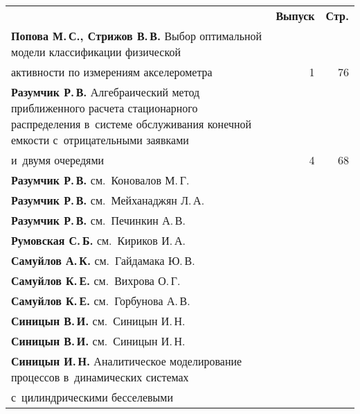 \pagebreak

\def\leftkol{АВТОРСКИЙ УКАЗАТЕЛЬ ЗА 2015 г.} %

\def\rightkol{АВТОРСКИЙ УКАЗАТЕЛЬ ЗА 2015 г.} %

\def\leftfootline{\small{\textbf{\thepage}
\hfill ИНФОРМАТИКА И ЕЁ ПРИМЕНЕНИЯ\ \ \ том~9\ \ \ выпуск~4\ \ \ 2015}
}%
 \def\rightfootline{\small{ИНФОРМАТИКА И ЕЁ ПРИМЕНЕНИЯ\ \ \ том~9\ \ \ выпуск~4\ \ \ 2015
 \hfill \textbf{\thepage}}}


{\tabcolsep=3pt
\begin{tabular}{p{388pt}rr}
&\textbf{Выпуск} & \textbf{Стр.}\\[3pt]
\textbf{Попова М.\,С., Стрижов В.\,В.} Выбор оптимальной модели
классификации физической\linebreak
\\[-12pt]
\hspace*{21pt}активности по измерениям
акселерометра&1&76\\[-.35pt]
\hangindent=21pt\noindent\textbf{Разумчик Р.\,В.} Алгебраический метод приближенного расчета
стационарного распределения в~сис\-те\-ме обслуживания конечной емкости
с~отрицательными заявками\linebreak
\\[-12pt]
\hspace*{21pt}и~двумя очередями&4&68\\[-.35pt]
\textbf{Разумчик Р.\,В.} см.\ Коновалов М.\,Г.&&\\[-.35pt]
\textbf{Разумчик Р.\,В.} см.\ Мейханаджян Л.\,А.&&\\[-.35pt]
\textbf{Разумчик Р.\,В.} см.\ Печинкин А.\,В.&&\\[-.35pt]
\textbf{Румовская С.\,Б.} см.\ Кириков И.\,А.&&\\[-.35pt]
\textbf{Самуйлов А.\,К.} см.\ Гайдамака Ю.\,В.&&\\[-.35pt]
\textbf{Самуйлов К.\,Е.} см.\ Вихрова О.\,Г.&&\\[-.35pt]
\textbf{Самуйлов К.\,Е.} см.\ Горбунова А.\,В.&&\\[-.35pt]
\textbf{Синицын В.\,И.} см.\ Синицын И.\,Н.&&\\[-.35pt]
\textbf{Синицын В.\,И.} см.\ Синицын И.\,Н.&&\\[-.35pt]
\textbf{Синицын И.\,Н.} Аналитическое моделирование процессов
в~динамических сис\-те\-мах\linebreak
\\[-12pt]
\hspace*{21pt}с~цилиндрическими бесселевыми

\end{tabular}}
